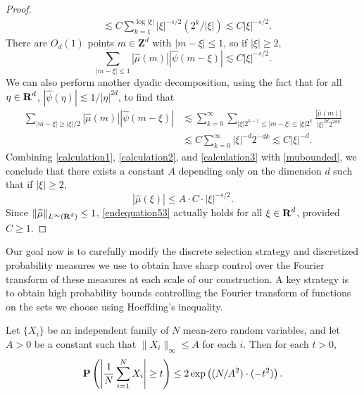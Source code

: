\begin{proof}
\begin{equation}
\begin{split}
        &\lesssim C \sum_{k = 1}^{\log |\xi|} |\xi|^{-s/2} (2^k / |\xi| ) \lesssim C |\xi|^{-s/2}.
    \end{split}
    \end{equation}
    There are $O_d(1)$ points $m \in \mathbf{Z}^d$ with $|m - \xi| \leq 1$, so if $|\xi| \geq 2$,
    \begin{equation} \label{calculation2}
        \sum_{|m - \xi| \leq 1} |\widehat{\mu}(m)| |\widehat{\psi}(m - \xi)| \lesssim C |\xi|^{-s/2}.
    \end{equation}
    We can also perform another dyadic decomposition, using the fact that for all $\eta \in \operatorname{\mathbf{R}}^d$, $|\widehat{\psi}(\eta)| \lesssim 1/|\eta|^{2d}$, to find that
    \begin{equation} \label{calculation3}
    \begin{split}
        \sum_{|m - \xi| \geq |\xi|/2} |\widehat{\mu}(m)| |\widehat{\psi}(m - \xi)| &\lesssim \sum_{k = 0}^\infty \sum_{|\xi| 2^{k-1} \leq |m - \xi| \leq |\xi| 2^k} \frac{|\widehat{\mu}(m)|}{|\xi|^{2d} 2^{2dk}}\\
        &\lesssim C \sum_{k = 0}^\infty |\xi|^{-d} 2^{-dk} \lesssim C |\xi|^{-d}.
    \end{split}
    \end{equation}
    Combining \eqref{calculation1}, \eqref{calculation2}, and \eqref{calculation3} with \eqref{mubounded}, we conclude that there exists a constant $A$ depending only on the dimension $d$ such that if $|\xi| \geq 2$,
    \begin{equation} \label{endequation53}
        |\widehat{\mu}(\xi)| \leq A \cdot C \cdot |\xi|^{-s/2}.
    \end{equation}
    Since $\| \widehat{\mu} \|_{L^\infty(\operatorname{\mathbf{R}}^d)} \leq 1$, \eqref{endequation53} actually holds for all $\xi \in \operatorname{\mathbf{R}}^d$, provided $C \geq 1$.
\end{proof}

Our goal now is to carefully modify the discrete selection strategy and discretized probability measures we use to obtain have sharp control over the Fourier transform of these measures at each scale of our construction. A key strategy is to obtain high probability bounds controlling the Fourier transform of functions on the sets we choose using Hoeffding's inequality.

\begin{theorem}
    Let $\{ X_i \}$ be an independent family of $N$ mean-zero random variables, and let $A > 0$ be a constant such that $\| X_i \|_\infty \leq A$ for each $i$. Then for each $t > 0$,
    \[ \operatorname{\mathbf{P}} \left( \left| \frac{1}{N} \sum_{i = 1}^N X_i \right| \geq t \right) \leq 2 \exp \left( (N/A^2) \cdot (- t^2) \right). \]
\end{theorem}


